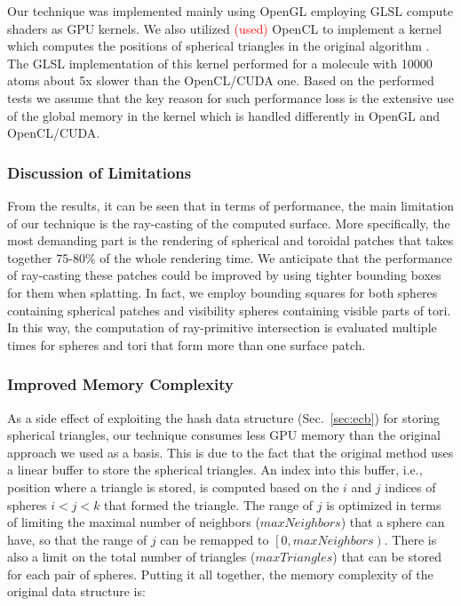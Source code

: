 Our technique was implemented mainly using OpenGL employing GLSL compute shaders as GPU kernels.
We also utilized \textcolor{red}{(used)} OpenCL to implement a kernel which computes the positions of spherical triangles in the original algorithm \cite{krone2011parallel}.
The GLSL implementation of this kernel performed for a molecule with {\tweakedsim}10000 atoms about 5x slower than the OpenCL/CUDA one.
Based on the performed tests we assume that the key reason for such performance loss is the extensive use of the global memory in the kernel which is handled differently in OpenGL and OpenCL/CUDA.

\subsubsection{Discussion of Limitations}
From the results, it can be seen that in terms of performance, the main limitation of our technique is the ray-casting of the computed surface.
More specifically, the most demanding part is the rendering of spherical and toroidal patches that takes together 75-80\% of the whole rendering time.
We anticipate that the performance of ray-casting these patches could be improved by using tighter bounding boxes for them when splatting.
In fact, we employ bounding squares for both spheres containing spherical patches and visibility spheres containing visible parts of tori.
In this way, the computation of ray-primitive intersection is evaluated multiple times for spheres and tori that form more than one surface patch.

\subsubsection{Improved Memory Complexity}

As a side effect of exploiting the hash data structure (Sec.~\ref{sec:ecb}) for storing spherical triangles, our technique consumes less GPU memory than the original approach we used as a basis.
This is due to the fact that the original method uses a linear buffer to store the spherical triangles.
An index into this buffer, i.e., position where a triangle is stored, is computed based on the $i$ and $j$ indices of spheres $i < j < k$ that formed the triangle.
The range of $j$ is optimized in terms of limiting the maximal number of neighbors ($maxNeighbors$) that a sphere can have, so that the range of $j$ can be remapped to $\left[0, maxNeighbors\right)$.
There is also a limit on the total number of triangles ($maxTriangles$) that can be stored for each pair of spheres.
Putting it all together, the memory complexity of the original data structure is:

